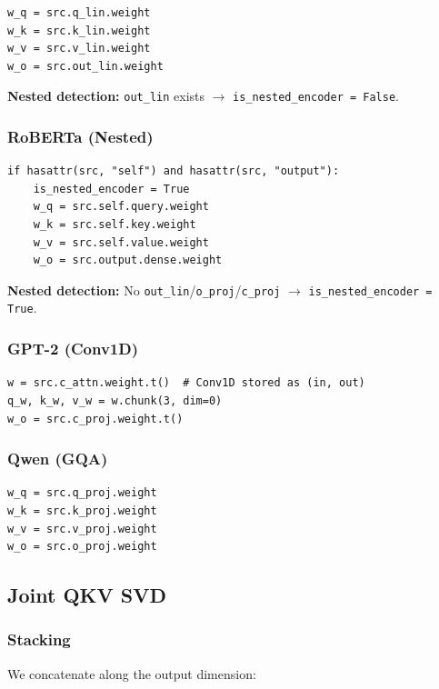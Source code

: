 \begin{lstlisting}
w_q = src.q_lin.weight
w_k = src.k_lin.weight
w_v = src.v_lin.weight
w_o = src.out_lin.weight
\end{lstlisting}

\textbf{Nested detection:} \texttt{out\_lin} exists $\to$ \texttt{is\_nested\_encoder = False}.

\subsubsection{RoBERTa (Nested)}

\begin{lstlisting}
if hasattr(src, "self") and hasattr(src, "output"):
    is_nested_encoder = True
    w_q = src.self.query.weight
    w_k = src.self.key.weight
    w_v = src.self.value.weight
    w_o = src.output.dense.weight
\end{lstlisting}

\textbf{Nested detection:} No \texttt{out\_lin}/\texttt{o\_proj}/\texttt{c\_proj} $\to$ \texttt{is\_nested\_encoder = True}.

\subsubsection{GPT-2 (Conv1D)}

\begin{lstlisting}
w = src.c_attn.weight.t()  # Conv1D stored as (in, out)
q_w, k_w, v_w = w.chunk(3, dim=0)
w_o = src.c_proj.weight.t()
\end{lstlisting}

\subsubsection{Qwen (GQA)}

\begin{lstlisting}
w_q = src.q_proj.weight
w_k = src.k_proj.weight
w_v = src.v_proj.weight
w_o = src.o_proj.weight
\end{lstlisting}

\subsection{Joint QKV SVD}

\subsubsection{Stacking}

We concatenate along the output dimension:

